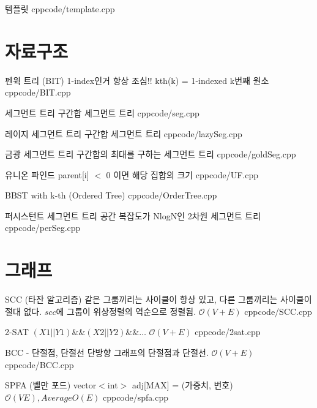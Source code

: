 \documentclass[landscape, 10pt, a4paper, oneside, twocolumn]{extarticle}
\begin{document}
\maketitlepage
\pagebreak











\Algorithm
{템플릿}
{}
{}
{cpp}{code/template.cpp}

\section{자료구조}

\Algorithm
{펜윅 트리 (BIT)}
{1-index인거 항상 조심!! kth(k) = 1-indexed k번째 원소}
{}
{cpp}{code/BIT.cpp}

\Algorithm
{세그먼트 트리}
{구간합 세그먼트 트리}
{}
{cpp}{code/seg.cpp}

\Algorithm
{레이지 세그먼트 트리}
{구간합 세그먼트 트리}
{}
{cpp}{code/lazySeg.cpp}

\Algorithm
{금광 세그먼트 트리}
{구간합의 최대를 구하는 세그먼트 트리}
{}
{cpp}{code/goldSeg.cpp}

\Algorithm
{유니온 파인드}
{parent[i] ${<}$ 0 이면 해당 집합의 크기
}
{}
{cpp}{code/UF.cpp}

 \Algorithm
{BBST with k-th (Ordered Tree)}
{}
{}
{cpp}{code/OrderTree.cpp}

\Algorithm
{퍼시스턴트 세그먼트 트리}
{공간 복잡도가 NlogN인 2차원 세그먼트 트리}
{}
{cpp}{code/perSeg.cpp}



\section{그래프}

\Algorithm
{SCC (타잔 알고리즘)}
{
같은 그룹끼리는 사이클이 항상 있고, 다른 그룹끼리는 사이클이 절대 없다. $scc$에 그룹이 위상정렬의 역순으로 정렬됨.
}
{$\mathcal{O}(V+E)$}
{cpp}{code/SCC.cpp}

\Algorithm
{2-SAT}
{$(X1||Y1)\&\&(X2||Y2)\&\&\dots$
}
{$\mathcal{O}(V+E)$}
{cpp}{code/2sat.cpp}

\Algorithm
{BCC - 단절점, 단절선}
{단방향 그래프의 단절점과 단절선. }
{$\mathcal{O}(V+E)$}
{cpp}{code/BCC.cpp}

\Algorithm
{SPFA (벨만 포드)}
{vector${<}$int${>}$ adj[MAX] = (가중치, 번호)}
{$\mathcal{O}(VE),{}Average {O}(E)$}
{cpp}{code/spfa.cpp}
\end{document}
